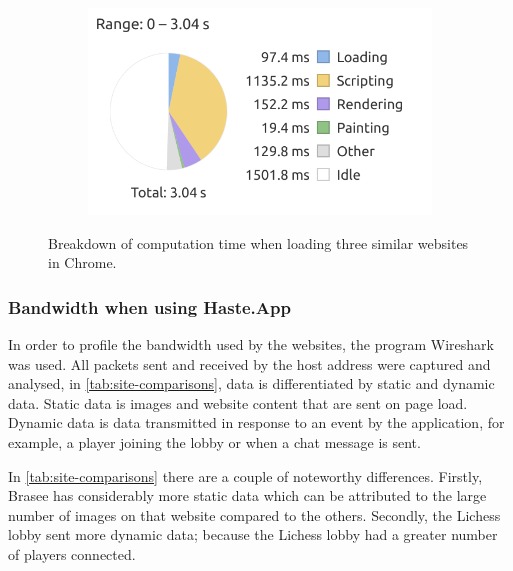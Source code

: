 \documentclass[a4paper]{article}
\begin{document}
\begin{figure}[h!]
\begin{subfigure}{0.5\textwidth}
        \includegraphics[width=\textwidth]{figure/clientsidePerformance/ligraph1.png}
    \end{subfigure}
    
    \caption{Breakdown of computation time when loading three similar websites in Chrome.}
    \label{fig:hastings-comparison}
\end{figure}

\subsubsection{Bandwidth when using Haste.App}
In order to profile the bandwidth used by the websites, the program Wireshark was used. All packets sent and received by the host address were captured and analysed, in \cref{tab:site-comparisons}, data is differentiated by static and dynamic data. Static data is images and website content that are sent on page load. Dynamic data is data transmitted in response to an event by the application, for example, a player joining the lobby or when a chat message is sent. 

In \cref{tab:site-comparisons} there are a couple of noteworthy differences. Firstly, Brasee has considerably more static data which can be attributed to the large number of images on that website compared to the others. Secondly, the Lichess lobby sent more dynamic data; because the Lichess lobby had a greater number of players connected.
\end{document}
